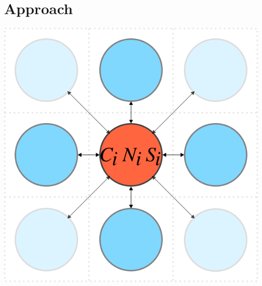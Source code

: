 \graphicspath{{images_low_res/}}
\section{Approach}
\label{sec:approach}


\begin{Figure}
  \centering
  \includegraphics[width=\linewidth]{square_array}
\end{Figure}

